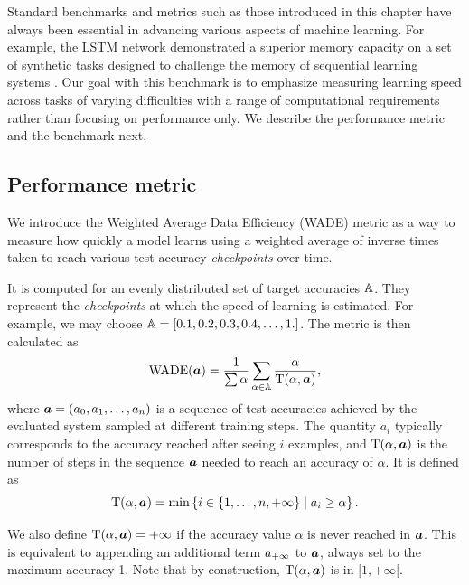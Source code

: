 Standard benchmarks and metrics such as those introduced in this chapter have
always been essential in advancing various aspects of machine learning. For
example, the LSTM network demonstrated a superior memory capacity on a set of
synthetic tasks designed to challenge the memory of sequential learning systems
\parencite{hochreiterLongShortTermMemory1997}. Our goal with this benchmark is
to emphasize measuring learning speed across tasks of varying difficulties with
a range of computational requirements rather than focusing on performance only.
We describe the performance metric and the benchmark next.



\subsection{Performance metric\label{sec:performance-metric}}

We introduce the Weighted Average Data Efficiency (WADE) metric as a way to
measure how quickly a model learns using a weighted average of inverse times
taken to reach various test accuracy \emph{checkpoints} over time.

It is computed for an evenly distributed set of target accuracies ${\mathbb{A}}$. They
represent the \emph{checkpoints} at which the speed of learning is estimated.
For example, we may choose ${\mathbb{A}} = [0.1, 0.2, 0.3, 0.4, \ldots, 1.]$. The metric is
then calculated as
\begin{equation}
\text{WADE}({\bm{a}}) = \frac{1}{\sum \alpha} \sum_{\alpha \in \mathbb{A}}\frac{\alpha}{\text{T}(\alpha, {\bm{a}})},
\label{eq:wade}
\end{equation}
where ${\bm{a}} = ({a}_{0}, {a}_{1}, \ldots, {a}_{n})$ is a sequence of test accuracies achieved by the evaluated system
sampled at different training steps. The quantity $a_{i}$ typically
corresponds to the accuracy reached after seeing $i$ examples, and
$\text{T}(\alpha, {\bm{a}})$ is the number of steps in the sequence ${\bm{a}}$ needed to reach
an accuracy of $\alpha$. It is defined as
\begin{equation}
  \text{T}(\alpha, {\bm{a}}) = \min\left\{ i \in \{1, \ldots, n, + \infty \}\; |\; a_{i} \geq \alpha \right\}.
\label{eq:tto}
\end{equation}

We also define $\text{T}(\alpha, {\bm{a}}) = +\infty$ if the accuracy value $\alpha$ is never
reached in ${\bm{a}}$. This is equivalent to appending an additional term ${a}_{+\infty}$
to ${\bm{a}}$, always set to the maximum accuracy 1. Note that by construction,
$\text{T}(\alpha, {\bm{a}})$ is in $[1, + \infty [$.

